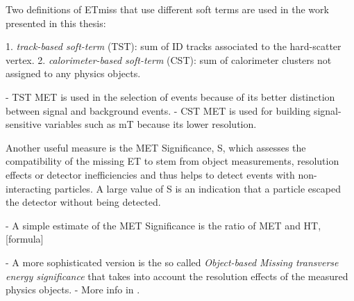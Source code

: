 Two definitions of ETmiss that use different soft terms are used in the work presented in this thesis:

1. \emph{track-based soft-term} (TST): sum of ID tracks associated to the hard-scatter vertex.
2. \emph{calorimeter-based soft-term} (CST): sum of calorimeter clusters not assigned to any physics objects.

- TST MET is used in the selection of events because of its better distinction between signal and background events.
- CST MET is used for building signal-sensitive variables such as mT because its lower resolution.




Another useful measure is the MET Significance, S, which assesses the compatibility of the missing ET to stem from object measurements, resolution effects or detector inefficiencies and thus helps to detect events with non-interacting particles.
A large value of S is an indication that a particle escaped the detector without being detected.

- A simple estimate of the MET Significance is the ratio of MET and HT, [formula]

- A more sophisticated version is the so called \emph{Object-based Missing transverse energy significance} that takes into account the resolution effects of the measured physics objects.
- More info in \cite{ATLAS-CONF-2018-038}.



